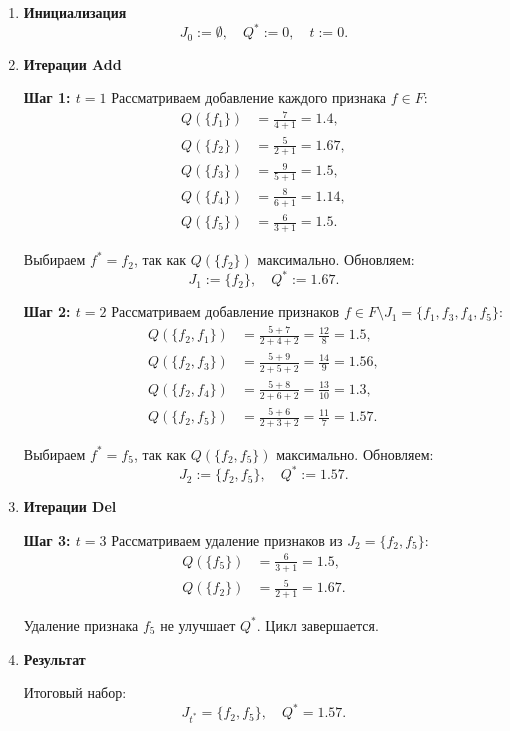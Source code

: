 \begin{enumerate}

\item \textbf{Инициализация}
\[
J_0 := \emptyset, \quad Q^* := 0, \quad t := 0.
\]

\item \textbf{Итерации Add}

\textbf{Шаг 1: \( t = 1 \)}
Рассматриваем добавление каждого признака \( f \in F \):  
\[
\begin{aligned}
Q(\{f_1\}) & = \frac{7}{4 + 1} = 1.4, \\
Q(\{f_2\}) & = \frac{5}{2 + 1} = 1.67, \\
Q(\{f_3\}) & = \frac{9}{5 + 1} = 1.5, \\
Q(\{f_4\}) & = \frac{8}{6 + 1} = 1.14, \\
Q(\{f_5\}) & = \frac{6}{3 + 1} = 1.5.
\end{aligned}
\]

Выбираем \( f^* = f_2 \), так как \( Q(\{f_2\}) \) максимально.  
Обновляем:  
\[
J_1 := \{f_2\}, \quad Q^* := 1.67.
\]

\textbf{Шаг 2: \( t = 2 \)}
Рассматриваем добавление признаков \( f \in F \setminus J_1 = \{f_1, f_3, f_4, f_5\} \):  
\[
\begin{aligned}
Q(\{f_2, f_1\}) & = \frac{5 + 7}{2 + 4 + 2} = \frac{12}{8} = 1.5, \\
Q(\{f_2, f_3\}) & = \frac{5 + 9}{2 + 5 + 2} = \frac{14}{9} = 1.56, \\
Q(\{f_2, f_4\}) & = \frac{5 + 8}{2 + 6 + 2} = \frac{13}{10} = 1.3, \\
Q(\{f_2, f_5\}) & = \frac{5 + 6}{2 + 3 + 2} = \frac{11}{7} = 1.57.
\end{aligned}
\]

Выбираем \( f^* = f_5 \), так как \( Q(\{f_2, f_5\}) \) максимально.  
Обновляем:  
\[
J_2 := \{f_2, f_5\}, \quad Q^* := 1.57.
\]

\item \textbf{Итерации Del}

\textbf{Шаг 3: \( t = 3 \)}
Рассматриваем удаление признаков из \( J_2 = \{f_2, f_5\} \):  
\[
\begin{aligned}
Q(\{f_5\}) & = \frac{6}{3 + 1} = 1.5, \\
Q(\{f_2\}) & = \frac{5}{2 + 1} = 1.67.
\end{aligned}
\]

Удаление признака \( f_5 \) не улучшает \( Q^* \). Цикл завершается.

\item \textbf{Результат}

Итоговый набор:  
\[
J_{t^*} = \{f_2, f_5\}, \quad Q^* = 1.57.
\]

\end{enumerate}





